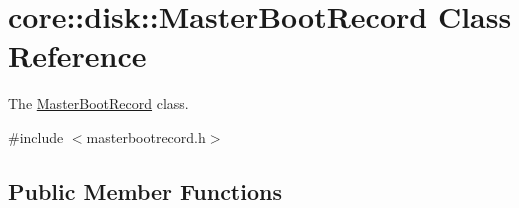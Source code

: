 \hypertarget{classcore_1_1disk_1_1_master_boot_record}{}\section{core\+:\+:disk\+:\+:Master\+Boot\+Record Class Reference}
\label{classcore_1_1disk_1_1_master_boot_record}


The \mbox{\hyperlink{classcore_1_1disk_1_1_master_boot_record}{Master\+Boot\+Record}} class.  




{\ttfamily \#include $<$masterbootrecord.\+h$>$}

\subsection*{Public Member Functions}
